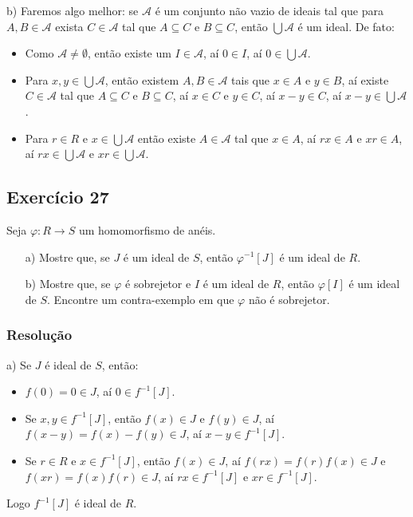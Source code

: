 \documentclass[10pt,a4paper]{article}
\begin{document}
\noindent
b) Faremos algo melhor: se $\mathcal{A}$ é um conjunto não vazio de ideais tal que para $A,B\in\mathcal{A}$ exista $C\in\mathcal{A}$ tal que $A\subseteq C$ e $B\subseteq C$, então $\bigcup\mathcal{A}$ é um ideal. De fato:
\begin{itemize}
\item Como $\mathcal{A}\neq\emptyset$, então existe um $I\in\mathcal{A}$, aí $0\in I$, aí $0\in\bigcup\mathcal{A}$.
\item Para $x,y\in\bigcup\mathcal{A}$, então existem $A,B\in\mathcal{A}$ tais que $x\in A$ e $y\in B$, aí existe $C\in\mathcal{A}$ tal que $A\subseteq C$ e $B\subseteq C$, aí $x\in C$ e $y\in C$, aí $x-y\in C$, aí $x-y\in\bigcup\mathcal{A}$.
\item Para $r\in R$ e $x\in\bigcup\mathcal{A}$ então existe $A\in\mathcal{A}$ tal que $x\in A$, aí $rx\in A$ e $xr\in A$, aí $rx\in\bigcup\mathcal{A}$ e $xr\in\bigcup\mathcal{A}$.
\end{itemize}

\subsection*{Exercício 27}
Seja $\varphi:R\rightarrow S$ um homomorfismo de anéis.
\begin{itemize}
\item[a)] Mostre que, se $J$ é um ideal de $S$, então $\varphi^{-1}[J]$ é um ideal de $R$.
\item[b)] Mostre que, se $\varphi$ é sobrejetor e $I$ é um ideal de $R$, então $\varphi[I]$ é um ideal de $S$. Encontre um contra-exemplo em que $\varphi$ não é sobrejetor.
\end{itemize}

\subsubsection*{Resolução}

a) Se $J$ é ideal de $S$, então:
\begin{itemize}
\item $f(0)=0\in J$, aí $0\in f^{-1}[J]$.
\item Se $x,y\in f^{-1}[J]$, então $f(x)\in J$ e $f(y)\in J$, aí $f(x-y)=f(x)-f(y)\in J$, aí $x-y\in f^{-1}[J]$.
\item Se $r\in R$ e $x\in f^{-1}[J]$, então $f(x)\in J$, aí $f(rx)=f(r)f(x)\in J$ e $f(xr)=f(x)f(r)\in J$, aí $rx\in f^{-1}[J]$ e $xr\in f^{-1}[J]$.
\end{itemize}
Logo $f^{-1}[J]$ é ideal de $R$.
\end{document}
